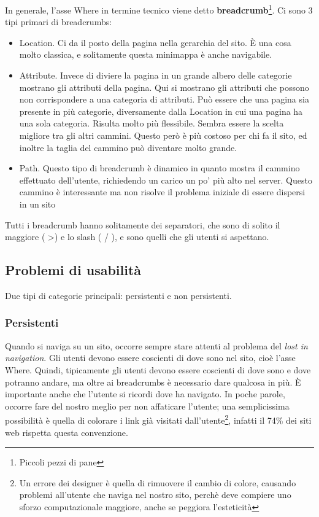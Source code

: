 In generale, l'asse Where in termine tecnico viene detto \textbf{breadcrumb}\footnote{Piccoli pezzi di pane}. Ci sono 3 tipi primari di breadcrumbs:
\begin{itemize}

\item Location. Ci da il posto della pagina nella gerarchia del sito. \`E una cosa molto classica, e solitamente questa minimappa \`e anche navigabile.

\item Attribute. Invece di diviere la pagina in un grande albero delle categorie mostrano gli attributi della pagina. Qui si mostrano gli attributi che possono non corrispondere a una categoria di attributi. Pu\`o essere che una pagina sia presente in pi\`u categorie, diversamente dalla Location in cui una pagina ha una sola categoria. Risulta molto pi\`u flessibile. Sembra essere la scelta migliore tra gli altri cammini. Questo per\`o \`e pi\`u costoso per chi fa il sito, ed inoltre la taglia del cammino pu\`o diventare molto grande.

\item Path. Questo tipo di breadcrumb \`e dinamico in quanto mostra il cammino effettuato dell'utente, richiedendo un carico un po' pi\`u alto nel server. Questo cammino \`e interessante ma non risolve il problema iniziale di essere dispersi in un sito

\end{itemize}

Tutti i breadcrumb hanno solitamente dei separatori, che sono di solito il maggiore ( \textgreater ) e lo slash ( / ), e sono quelli che gli utenti si aspettano.

\subsection{Problemi di usabilit\`a}

Due tipi di categorie principali: persistenti e non persistenti.

\subsubsection{Persistenti}

Quando si naviga su un sito, occorre sempre stare attenti al problema del \textit{lost in navigation}. Gli utenti devono essere coscienti di dove sono nel sito, cio\`e l'asse Where. Quindi, tipicamente gli utenti devono essere coscienti di dove sono e dove potranno andare, ma oltre ai breadcrumbs \`e necessario dare qualcosa in pi\`u. \`E importante anche che l'utente si ricordi dove ha navigato. In poche parole, occorre fare del nostro meglio per non affaticare l'utente; una semplicissima possibilit\`a \`e quella di colorare i link gi\`a visitati dall'utente\footnote{Un errore dei designer \`e quella di rimuovere il cambio di colore, causando problemi all'utente che naviga nel nostro sito, perch\`e deve compiere uno sforzo computazionale maggiore, anche se peggiora l'esteticit\`a}, infatti il 74\% dei siti web rispetta questa convenzione.

